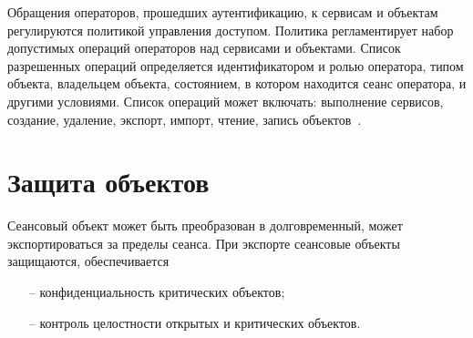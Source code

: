
Обращения операторов, прошедших аутентификацию, к сервисам и объектам~\TOE 
регулируются политикой управления доступом. 
Политика регламентирует набор допустимых 
операций операторов над сервисами и объектами.
%
Список разрешенных операций определяется идентификатором и ролью 
оператора, типом объекта, владельцем объекта, 
состоянием, в котором находится сеанс оператора, и другими условиями.
%
Список операций может включать: 
выполнение сервисов,
создание,
удаление,
экспорт,
импорт,
чтение, 
запись объектов~.

\section{Защита объектов}

Сеансовый объект может быть преобразован в долговременный,
\ie может экспортироваться за пределы сеанса.
%
При экспорте сеансовые объекты защищаются, \ie обеспечивается
\begin{itemize}
\item[--]
конфиденциальность критических объектов;
\item[--]
контроль целостности открытых и критических объектов.
\end{itemize}


%

